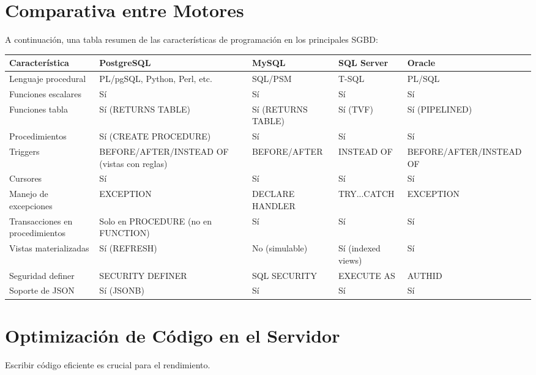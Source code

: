 \documentclass[12pt,a4paper,openany,oneside]{book}
\begin{document}
\chapter{Comparativa entre Motores}
A continuación, una tabla resumen de las características de programación en los principales SGBD:

\begin{center}
\begin{tabular}{|l|l|l|l|l|}
\hline
\textbf{Característica} & \textbf{PostgreSQL} & \textbf{MySQL} & \textbf{SQL Server} & \textbf{Oracle} \\ \hline
Lenguaje procedural & PL/pgSQL, Python, Perl, etc. & SQL/PSM & T-SQL & PL/SQL \\
Funciones escalares & Sí & Sí & Sí & Sí \\
Funciones tabla & Sí (RETURNS TABLE) & Sí (RETURNS TABLE) & Sí (TVF) & Sí (PIPELINED) \\
Procedimientos & Sí (CREATE PROCEDURE) & Sí & Sí & Sí \\
Triggers & BEFORE/AFTER/INSTEAD OF (vistas con reglas) & BEFORE/AFTER & INSTEAD OF & BEFORE/AFTER/INSTEAD OF \\
Cursores & Sí & Sí & Sí & Sí \\
Manejo de excepciones & EXCEPTION & DECLARE HANDLER & TRY...CATCH & EXCEPTION \\
Transacciones en procedimientos & Solo en PROCEDURE (no en FUNCTION) & Sí & Sí & Sí \\
Vistas materializadas & Sí (REFRESH) & No (simulable) & Sí (indexed views) & Sí \\
Seguridad definer & SECURITY DEFINER & SQL SECURITY & EXECUTE AS & AUTHID \\
Soporte de JSON & Sí (JSONB) & Sí & Sí & Sí \\
\hline
\end{tabular}
\end{center}

\chapter{Optimización de Código en el Servidor}
Escribir código eficiente es crucial para el rendimiento.
\end{document}
